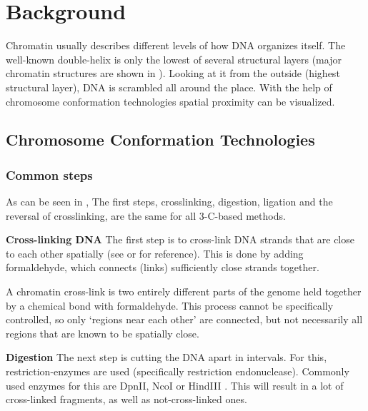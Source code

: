 \chapter{Background}\label{chap:background}



Chromatin usually describes different levels of how DNA organizes itself. The
well-known double-helix is only the lowest of several structural layers (major
chromatin structures are shown in ). Looking at it from the
outside (highest structural layer), DNA is scrambled all around the place. With
the help of chromosome conformation technologies spatial proximity can be
visualized.




\section{Chromosome Conformation Technologies}\label{sec:cct}

\subsection{Common steps}\label{sec:common}

As can be seen in , The first steps, crosslinking, digestion,
ligation and the reversal of crosslinking, are the same for all 3-C-based methods.


\textbf{Cross-linking DNA}\label{sec:crosslinking}
The first step is to cross-link DNA strands that are close to each other
spatially (see  or  for reference). This is done by adding
formaldehyde, which connects (links) sufficiently close strands together.

A chromatin cross-link is two entirely different parts of the genome held
together by a chemical bond with formaldehyde. This process cannot be
specifically controlled, so only `regions near each other' are connected, but
not necessarily all regions that are known to be spatially close.


\textbf{Digestion}\label{sec:digestion}
The next step is cutting the DNA apart in intervals. For this,
restriction-enzymes are used (specifically restriction endonuclease). Commonly
used enzymes for this are DpnII, NcoI or HindIII
\cite{lieberman2009comprehensive}. This will result in a lot of cross-linked
fragments, as well as not-cross-linked ones.


